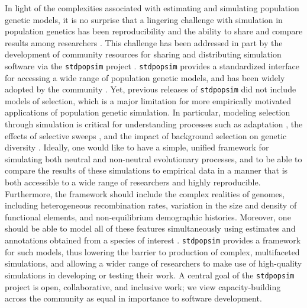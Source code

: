 \documentclass[hidelinks]{article}
\newcommand{\stdpopsim}{\texttt{stdpopsim}\xspace}
\begin{document}
    In light of the complexities associated with estimating and simulating
    population genetic models, it is no surprise that
    a lingering challenge with simulation in population genetics has been
    reproducibility and the ability to share and compare results among
    researchers \citep[e.g.,][]{ragsdale2020lessons}.
    This challenge has been addressed in part by the development
    of community resources for sharing and distributing simulation software
    via the \stdpopsim project \citep{adrion2020community}. \stdpopsim
    provides a standardized interface for accessing a wide range of
    population genetic models, and has been widely adopted by the community
    \citep[e.g.,][]{speidel2021inferring, wang2021automatic, yang2022trustgwas, degiorgio2022spatially, browning2023fast, schweiger2023ultrafast, temple2024modeling, haag2025pandora}.
    Yet, previous releases of \stdpopsim did not include
    models of selection, which is a major limitation for more empirically motivated
    applications of population genetic simulation. In particular, modeling selection
    through simulation is critical for understanding processes such
    as adaptation \citep[e.g.][]{thornton2019polygenic,hartfield2024polygenic}, the effects of selective sweeps
    \citep[e.g.][]{braverman1995hitchhiking,fay2000hitchhiking,przeworski2002signature,przeworski2005signature,schrider2015soft},
    and the impact of background selection on genetic diversity
    \citep[e.g.][]{charlesworth1993effect,charlesworth1995pattern,williamson2002genealogy,ewing2016consequences,torres2020temporal}.
    Ideally, one would like
    to have a simple, unified framework for simulating both neutral and
    non-neutral evolutionary processes, and to be able to compare the
    results of these simulations to empirical data in a manner that is
    both accessible to a wide range of researchers and highly reproducible.
    Furthermore, the framework should include the complex realities of
    genomes, including heterogeneous recombination rates,
    variation in the size and density of functional elements, and
    non-equilibrium demographic histories. Moreover, one should be able
    to model all of these features simultaneously using estimates and annotations obtained
    from a species of interest \citep[e.g.][]{schrider2020background,rodrigues2024shared}.
    \stdpopsim{} provides a framework for such models,
    thus lowering the barrier to production of complex, multifaceted simulations,
    and allowing a wider range of researchers to make use of high-quality simulations
    in developing or testing their work.
    A central goal of the \stdpopsim project is open, collaborative, and inclusive work;
    we view capacity-building across the community as equal in importance to software development.
\end{document}

